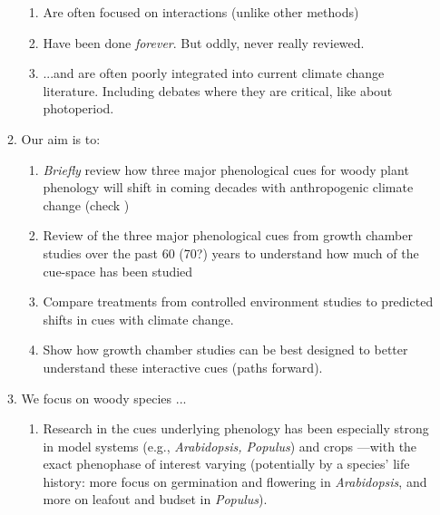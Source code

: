 \documentclass[11pt,letterpaper]{article}
\begin{document}
\begin{enumerate}
\begin{enumerate}
\begin{enumerate}
\item Are often focused on interactions (unlike other methods)
\item Have been done \emph{forever}. But oddly, never really reviewed.
\item  ...and are often poorly integrated into current climate change literature. Including debates where they are critical, like about photoperiod. 
\end{enumerate}
\item Our aim is to:
\begin{enumerate}
\item \emph{Briefly} review how three major phenological cues for woody plant phenology will shift in coming decades with anthropogenic climate change (check \citet{primack2015})
\item Review of the three major phenological cues from growth chamber studies over the past 60 (70?) years to understand how much of the cue-space has been studied
\item Compare treatments from controlled environment studies to predicted shifts in cues with climate change.  
\item Show how growth chamber studies can be best designed to better understand these interactive cues (paths forward). 
\end{enumerate}
\item We focus on woody species ...
\begin{enumerate}
\item Research in the cues underlying phenology has been especially strong in model systems (e.g., \emph{Arabidopsis, Populus}) and crops \citep{cesaraccio2004}---with the exact phenophase of interest varying (potentially by a species' life history: more focus on germination and flowering in \emph{Arabidopsis}, and more on leafout and budset in \emph{Populus}).


\end{enumerate}
\end{enumerate}
\end{enumerate}
\end{document}
